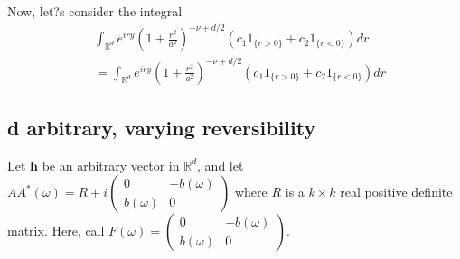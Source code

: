 \documentclass[11pt]{article}
\begin{document}
Now, let?s consider the integral \begin{align*}
&\int_{\mathbb{R}^d} e^{iry} \left(1 + \frac{r^2}{a^2}\right)^{-\nu + d/2} (c_1 1_{\{r > 0\}} + c_2 1_{\{r < 0\}}) dr \\
&=\int_{\mathbb{R}^d} e^{iry} \left(1 + \frac{r^2}{a^2}\right)^{-\nu + d/2} (c_1 1_{\{r > 0\}} + c_2 1_{\{r < 0\}}) dr
\end{align*}

\subsection{d arbitrary, varying reversibility}

Let $ \boldsymbol{h}$ be an arbitrary vector in $\mathbb{R}^d$, and let $AA^*(\omega) = R + i\begin{pmatrix} 0 & -b(\omega) \\  b(\omega) & 0\end{pmatrix}$ where $R$ is a $k\times k$ real positive definite matrix. Here, call $F(\omega) = \begin{pmatrix} 0 & -b(\omega) \\  b(\omega) & 0\end{pmatrix}$.
\end{document}
